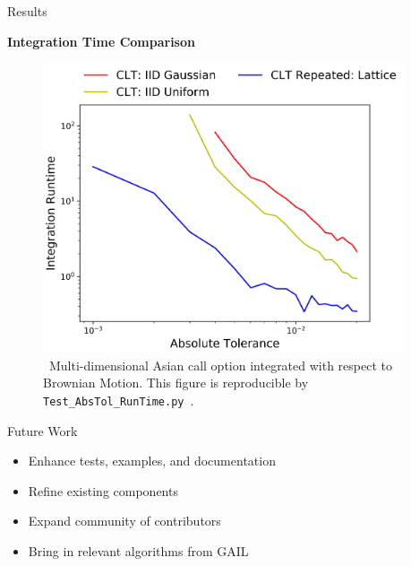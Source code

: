 \documentclass[final]{beamer}
\newcommand{\bfCenter}[1]{\centerline{\textbf{#1}}}
\newlength{\sepwid}
\newlength{\onecolwid}
\begin{document}
\begin{frame}[t]
\begin{columns}[t]
\begin{column}{\sepwid}\end{column}
\begin{column}{\onecolwid}\vspace{-.3in}
\begin{block}{Results}
    \bfCenter{Integration Time Comparison}
    \begin{figure}
        \includegraphics[width=1\textwidth]{Images/AbsTol_Runtime_LinePlot.png}
        \vspace{-1ex}
        \caption{\ Multi-dimensional Asian call option integrated with respect to  Brownian Motion. This figure is reproducible by \texttt{Test\_AbsTol\_RunTime.py}~\cite{HicEtal19}.}
    \end{figure}
\end{block}

\vspace{-.8in}
\begin{block}{Future Work}
    \begin{itemize}
        \item Enhance tests, examples, and documentation
        \item Refine existing components
        \item Expand community of contributors
        \item Bring in relevant algorithms from GAIL~\cite{ChoEtal19}
    \end{itemize}
\end{block}


\end{column}
\end{columns}
\end{frame}
\end{document}
